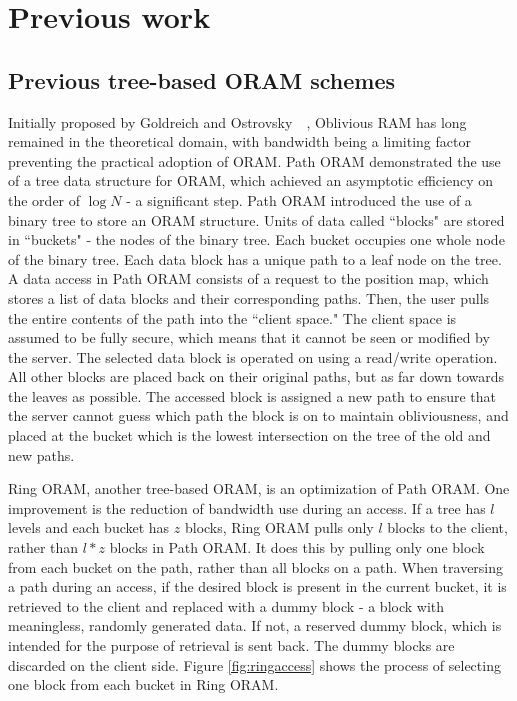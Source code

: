\documentclass[12pt, oneside]{article}   	%
\begin{document}
\section{Previous work}

\subsection{Previous tree-based ORAM schemes}
Initially proposed by Goldreich and Ostrovsky~\cite{gold}~\cite{goldostrov}, Oblivious RAM has long remained in the theoretical domain, with bandwidth being a limiting factor preventing the practical adoption of ORAM. Path ORAM demonstrated the use of a tree data structure for ORAM, which achieved an asymptotic efficiency on the order of $\log N$ - a significant step. Path ORAM introduced the use of a binary tree to store an ORAM structure. Units of data called ``blocks" are stored in ``buckets" - the nodes of the binary tree. Each bucket occupies one whole node of the binary tree. Each data block has a unique path to a leaf node on the tree. A data access in Path ORAM consists of a request to the position map, which stores a list of data blocks and their corresponding paths. Then, the user pulls the entire contents of the path into the ``client space." The client space is assumed to be fully secure, which means that it cannot be seen or modified by the server. The selected data block is operated on using a read/write operation. All other blocks are placed back on their original paths, but as far down towards the leaves as possible. The accessed block is assigned a new path to ensure that the server cannot guess which path the block is on to maintain obliviousness, and placed at the bucket which is the lowest intersection on the tree of the old and new paths. 

Ring ORAM, another tree-based ORAM, is an optimization of Path ORAM. One improvement is the reduction of bandwidth use during an access. If a tree has $l$ levels and each bucket has $z$ blocks, Ring ORAM pulls only $l$ blocks to the client, rather than $l*z$ blocks in Path ORAM. It does this by pulling only one block from each bucket on the path, rather than all blocks on a path. When traversing a path during an access, if the desired block is present in the current bucket, it is retrieved to the client and replaced with a dummy block - a block with meaningless, randomly generated data. If not, a reserved dummy block, which is intended for the purpose of retrieval is sent back. The dummy blocks are discarded on the client side. Figure \ref{fig:ringaccess} shows the process of selecting one block from each bucket in Ring ORAM.
\end{document}
